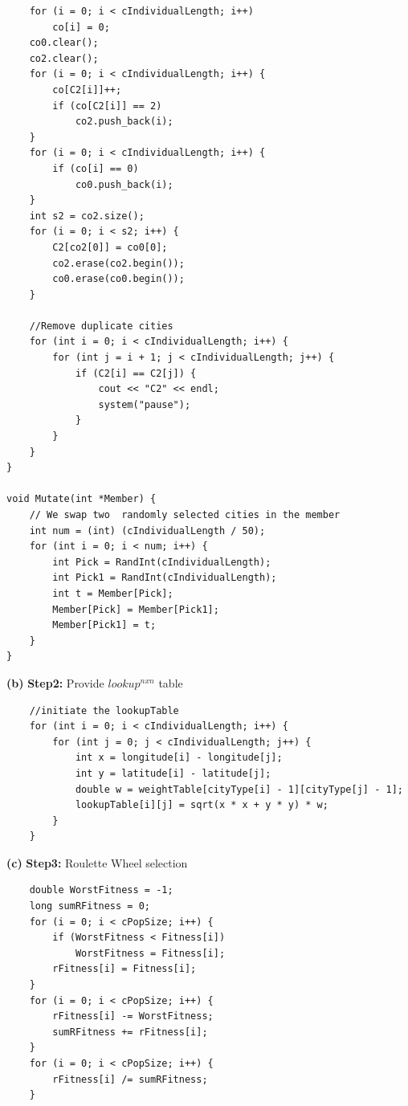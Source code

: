 \documentclass[11pt]{article}
\renewcommand\part[1]{\vspace{.10in}\textbf{(#1)}}
\newcommand\two{\vspace{.10in}\textbf{Step2: }}
\newcommand\three{\vspace{.10in}\textbf{Step3: }}
\begin{document}
\begin{lstlisting}
    for (i = 0; i < cIndividualLength; i++)
        co[i] = 0;
    co0.clear();
    co2.clear();
    for (i = 0; i < cIndividualLength; i++) {
        co[C2[i]]++;
        if (co[C2[i]] == 2)
            co2.push_back(i);
    }
    for (i = 0; i < cIndividualLength; i++) {
        if (co[i] == 0)
            co0.push_back(i);
    }
    int s2 = co2.size();
    for (i = 0; i < s2; i++) {
        C2[co2[0]] = co0[0];
        co2.erase(co2.begin());
        co0.erase(co0.begin());
    }

    //Remove duplicate cities
    for (int i = 0; i < cIndividualLength; i++) {
        for (int j = i + 1; j < cIndividualLength; j++) {
            if (C2[i] == C2[j]) {
                cout << "C2" << endl;
                system("pause");
            }
        }
    }
}

void Mutate(int *Member) {
    // We swap two  randomly selected cities in the member
    int num = (int) (cIndividualLength / 50);
    for (int i = 0; i < num; i++) {
        int Pick = RandInt(cIndividualLength);
        int Pick1 = RandInt(cIndividualLength);
        int t = Member[Pick];
        Member[Pick] = Member[Pick1];
        Member[Pick1] = t;
    }
}

\end{lstlisting}

\part{b} \two Provide $lookup^{nxn}$ table\\

\begin{lstlisting}
    //initiate the lookupTable
    for (int i = 0; i < cIndividualLength; i++) {
        for (int j = 0; j < cIndividualLength; j++) {
            int x = longitude[i] - longitude[j];
            int y = latitude[i] - latitude[j];
            double w = weightTable[cityType[i] - 1][cityType[j] - 1];
            lookupTable[i][j] = sqrt(x * x + y * y) * w;
        }
    }
\end{lstlisting}

\part{c} \three Roulette Wheel selection\\
\begin{lstlisting}
    double WorstFitness = -1;
    long sumRFitness = 0;
    for (i = 0; i < cPopSize; i++) {
        if (WorstFitness < Fitness[i])
            WorstFitness = Fitness[i];
        rFitness[i] = Fitness[i];
    }
    for (i = 0; i < cPopSize; i++) {
        rFitness[i] -= WorstFitness;
        sumRFitness += rFitness[i];
    }
    for (i = 0; i < cPopSize; i++) {
        rFitness[i] /= sumRFitness;
    }
\end{lstlisting}
\end{document}
